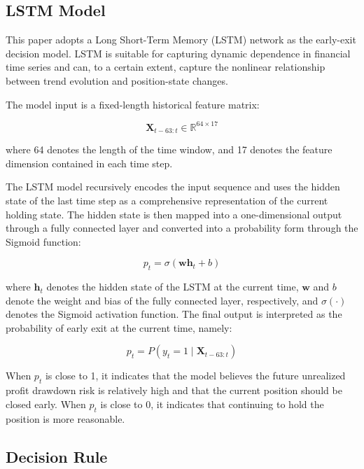 \documentclass[12pt]{article}
\begin{document}
\subsection{LSTM Model}

This paper adopts a Long Short-Term Memory (LSTM) network as the early-exit decision model. 
LSTM is suitable for capturing dynamic dependence in financial time series and can, to a 
certain extent, capture the nonlinear relationship between trend evolution and position-state 
changes.

The model input is a fixed-length historical feature matrix:

\begin{equation}
    \mathbf{X}_{t-63:t} \in \mathbb{R}^{64 \times 17}
\end{equation}

where 64 denotes the length of the time window, and 17 denotes the feature dimension contained 
in each time step.

The LSTM model recursively encodes the input sequence and uses the hidden state of the last 
time step as a comprehensive representation of the current holding state. The hidden state is 
then mapped into a one-dimensional output through a fully connected layer and converted into a 
probability form through the Sigmoid function:

\begin{equation}
    p_t = \sigma(\mathbf{w}\mathbf{h}_t + b)
\end{equation}

where $\mathbf{h}_t$ denotes the hidden state of the LSTM at the current time, $\mathbf{w}$ and 
$b$ denote the weight and bias of the fully connected layer, respectively, and $\sigma(\cdot)$ 
denotes the Sigmoid activation function. The final output is interpreted as the probability of 
early exit at the current time, namely:

\begin{equation}
    p_t = P(y_t = 1 \mid \mathbf{X}_{t-63:t})
\end{equation}

When $p_t$ is close to 1, it indicates that the model believes the future unrealized profit 
drawdown risk is relatively high and that the current position should be closed early. When 
$p_t$ is close to 0, it indicates that continuing to hold the position is more reasonable.

\subsection{Decision Rule}
\end{document}
